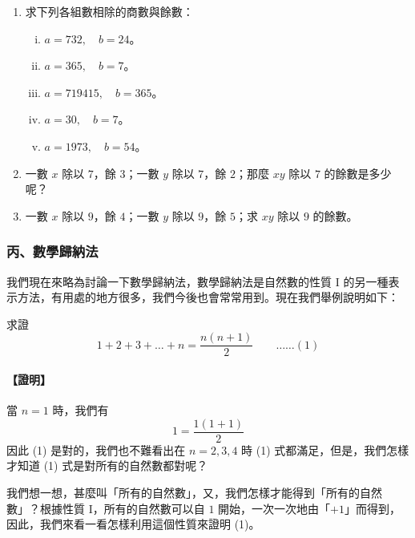 \begin{enumerate}[1., leftmargin=2em]
  \item 求下列各組數相除的商數與餘數：
  \begin{enumerate}[(i)]
    \item $a = 732, \quad b = 24$。
    \item $a = 365, \quad b = 7$。
    \item $a = 719415, \quad b = 365$。
    \item $a = 30, \quad b = 7$。
    \item $a = 1973, \quad b = 54$。
  \end{enumerate}
  \item 一數 $x$ 除以 $7$，餘 $3$；一數 $y$ 除以 $7$，餘 $2$；那麼 $xy$ 除以 $7$ 的餘數是多少呢？
  \item 一數 $x$ 除以 $9$，餘 $4$；一數 $y$ 除以 $9$，餘 $5$；求 $xy$ 除以 $9$ 的餘數。
\end{enumerate}

\subsubsection*{丙、數學歸納法}\label{subsec:induction}

我們現在來略為討論一下數學歸納法，數學歸納法是自然數的性質 I 的另一種表示方法，有用處的地方很多，我們今後也會常常用到。現在我們舉例說明如下：

\begin{example}\label{ex:b1-3-1}
求證
\begin{equation}\label{eq:sum_integers_formula}
  1+2+3+\dots+n = \frac{n(n+1)}{2} \qquad \dots\dots (1)
\end{equation}
\end{example}

\paragraph{【證明】}當 $n=1$ 時，我們有
\begin{equation*}
  1 = \frac{1(1+1)}{2}
\end{equation*}
因此 (1) 是對的，我們也不難看出在 $n=2, 3, 4$ 時 (1) 式都滿足，但是，我們怎樣才知道 (1) 式是對所有的自然數都對呢？

我們想一想，甚麼叫「所有的自然數」，又，我們怎樣才能得到「所有的自然數」？根據性質 I，所有的自然數可以自 $1$ 開始，一次一次地由「$+1$」而得到，因此，我們來看一看怎樣利用這個性質來證明 (1)。

